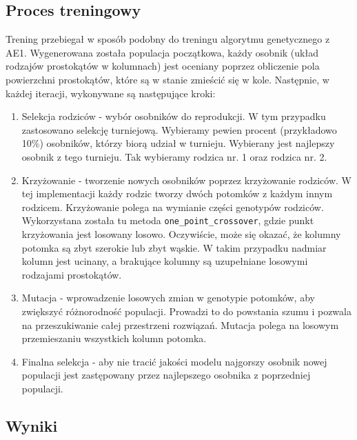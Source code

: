 \documentclass{article}
\begin{document}
\subsection*{Proces treningowy}
Trening przebiegał w sposób podobny do treningu algorytmu genetycznego z AE1. Wygenerowana została populacja początkowa, każdy osobnik (układ rodzajów prostokątów w kolumnach) jest oceniany poprzez obliczenie pola powierzchni prostokątów, które są w stanie zmieścić się w kole. Następnie, w każdej iteracji, wykonywane są następujące kroki:
\begin{enumerate}
    \item Selekcja rodziców - wybór osobników do reprodukcji. W tym przypadku zastosowano selekcję turniejową. Wybieramy pewien procent (przykładowo 10\%) osobników, którzy biorą udział w turnieju. Wybierany jest najlepszy osobnik z tego turnieju. Tak wybieramy rodzica nr. 1 oraz rodzica nr. 2.
    \item Krzyżowanie - tworzenie nowych osobników poprzez krzyżowanie rodziców. W tej implementacji każdy rodzic tworzy dwóch potomków z każdym innym rodzicem. Krzyżowanie polega na wymianie części genotypów rodziców. Wykorzystana została tu metoda \texttt{one\_point\_crossover}, gdzie punkt krzyżowania jest losowany losowo. Oczywiście, może się okazać, że kolumny potomka są zbyt szerokie lub zbyt wąskie. W takim przypadku nadmiar kolumn jest ucinany, a brakujące kolumny są uzupełniane losowymi rodzajami prostokątów.
    \item Mutacja - wprowadzenie losowych zmian w genotypie potomków, aby zwiększyć różnorodność populacji. Prowadzi to do powstania szumu i pozwala na przeszukiwanie całej przestrzeni rozwiązań. Mutacja polega na losowym przemieszaniu wszystkich kolumn potomka.
    \item Finalna selekcja - aby nie tracić jakości modelu najgorszy osobnik nowej populacji jest zastępowany przez najlepszego osobnika z poprzedniej populacji.
\end{enumerate}

\subsection*{Wyniki}
\end{document}
